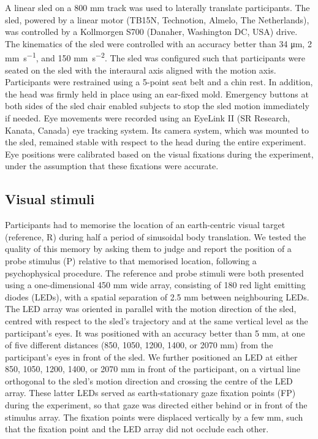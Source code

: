 A linear sled on a 800 \si{\milli\metre} track was used to laterally translate participants. The sled, powered by a linear motor (TB15N, Technotion, Almelo, The Netherlands), was controlled by a Kollmorgen S700 (Danaher, Washington DC, USA) drive. The kinematics of the sled were controlled with an accuracy better than 34 \si{\micro\metre}, 2 \si{\milli\metre\per\second}, and 150 \si{\milli\metre\per\square\second}. The sled was configured such that participants were seated on the sled with the interaural axis aligned with the motion axis. Participants were restrained using a 5-point seat belt and a chin rest. In addition, the head was firmly held in place using an ear-fixed mold.  Emergency buttons at both sides of the sled chair enabled subjects to stop the sled motion immediately if needed. Eye movements were recorded using an EyeLink II (SR Research, Kanata, Canada) eye tracking system. Its camera system, which was mounted to the sled, remained stable with respect to the head during the entire experiment. Eye positions were calibrated based on the visual fixations during the experiment, under the assumption that these fixations were accurate.

\subsection{Visual stimuli}

Participants had to memorise the location of an earth-centric visual target (reference, R) during half a period of sinusoidal body translation. We tested the quality of this memory by asking them to judge and report the position of a probe stimulus (P) relative to that memorised location, following a psychophysical procedure. The reference and probe stimuli were both presented using a one-dimensional 450 \si{\milli\metre} wide array, consisting of 180 red light emitting diodes (LEDs), with a spatial separation of 2.5 \si{\milli\metre} between neighbouring LEDs. The LED array was oriented in parallel with the motion direction of the sled, centred with respect to the sled's trajectory and at the same vertical level as the participant's eyes. It was positioned with an accuracy better than 5 mm, at one of five different distances (850, 1050, 1200, 1400, or 2070 \si{\milli\metre}) from the participant's eyes in front of the sled. We further positioned an LED at either 850, 1050, 1200, 1400, or 2070 \si{\milli\metre} in front of the participant, on a virtual line orthogonal to the sled's motion direction and crossing the centre of the LED array. These latter LEDs served as earth-stationary gaze fixation points (FP) during the experiment, so that gaze was directed either behind or in front of the stimulus array. The fixation points were displaced vertically by a few mm, such that the fixation point and the LED array did not occlude each other.

